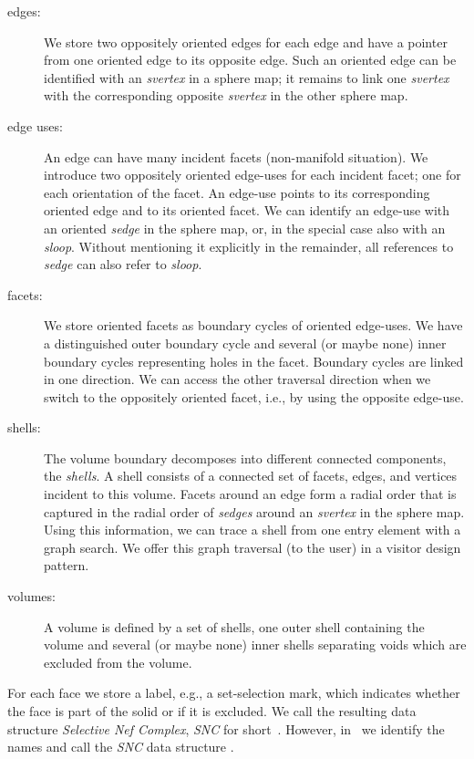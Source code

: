 \begin{description}
    \item[edges:] 
        We store two oppositely oriented edges for each edge
        and have a pointer from one oriented edge to its opposite edge.
        Such an oriented edge can be identified with an \emph{svertex}
        in a sphere map; it remains to link one \emph{svertex} with
        the corresponding opposite \emph{svertex} in the other sphere map.
    \item[edge uses:]
        An edge can have many incident facets (non-manifold situation).
        We introduce two oppositely oriented edge-uses for each incident
        facet; one for each orientation of the facet. An edge-use points 
        to its corresponding oriented edge and to its oriented facet.   
        We can identify an edge-use with an oriented \emph{sedge} in the 
        sphere map, or, in the special case also with an
        \emph{sloop}. Without mentioning it explicitly in the
        remainder, all references to \emph{sedge\/} can also refer to
        \emph{sloop}.
    \item[facets:]
        We store oriented facets as boundary cycles of oriented 
        edge-uses. We have a distinguished outer boundary cycle and 
        several (or maybe none) inner boundary cycles representing holes
        in the facet. Boundary cycles are linked in one direction. We can 
        access the other traversal direction when we switch to the oppositely
        oriented facet, i.e., by using the opposite edge-use.
    \item[shells:]
        The volume boundary decomposes into different connected
        components, the \emph{shells}. A shell consists of a connected set
        of facets, edges, and vertices incident to this volume. Facets 
        around an edge form a radial order that is captured in the
        radial order of \emph{sedges} around an \emph{svertex} in the
        sphere map. Using this information, we can trace a shell from
        one entry element with a graph search. We offer this graph
        traversal (to the user) in a visitor design pattern.
    \item[volumes:]
        A volume is defined by a set of shells, one outer shell containing
        the volume and several (or maybe none) inner shells separating voids
        which are excluded from the volume.
\end{description}

For each face we store a label, e.g., a set-selection mark, which
indicates whether the face is part of the solid or if it is
excluded. We call the resulting data structure \emph{Selective Nef
Complex}, \emph{SNC} for short~\cite{cgal:ghhkm-bosnc-03}. However, in
\cgal\ we identify the names and call the \emph{SNC} data structure
. 

